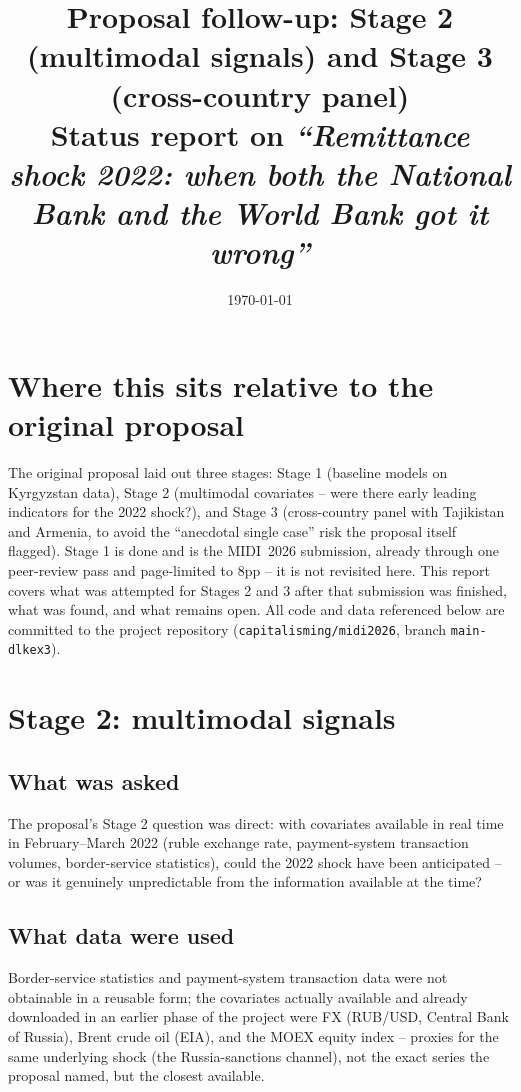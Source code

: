 \documentclass[11pt]{article}
\title{Proposal follow-up: Stage 2 (multimodal signals) and Stage 3 (cross-country panel)\\
\large Status report on \emph{``Remittance shock 2022: when both the National Bank and the World Bank got it wrong''}}
\author{}
\date{\today}
\begin{document}
\maketitle

\section*{Where this sits relative to the original proposal}

The original proposal laid out three stages: Stage 1 (baseline models on Kyrgyzstan data),
Stage 2 (multimodal covariates -- were there early leading indicators for the 2022 shock?), and
Stage 3 (cross-country panel with Tajikistan and Armenia, to avoid the ``anecdotal single case''
risk the proposal itself flagged). Stage 1 is done and is the MIDI~2026 submission, already
through one peer-review pass and page-limited to 8pp -- it is not revisited here. This report
covers what was attempted for Stages 2 and 3 after that submission was finished, what was found,
and what remains open. All code and data referenced below are committed to the project
repository (\texttt{capitalisming/midi2026}, branch \texttt{main-dlkex3}).

\section{Stage 2: multimodal signals}

\subsection{What was asked}
The proposal's Stage 2 question was direct: with covariates available in real time in
February--March 2022 (ruble exchange rate, payment-system transaction volumes, border-service
statistics), could the 2022 shock have been anticipated -- or was it genuinely unpredictable
from the information available at the time?

\subsection{What data were used}
Border-service statistics and payment-system transaction data were not obtainable in a reusable
form; the covariates actually available and already downloaded in an earlier phase of the
project were FX (RUB/USD, Central Bank of Russia), Brent crude oil (EIA), and the MOEX equity
index -- proxies for the same underlying shock (the Russia-sanctions channel), not the exact
series the proposal named, but the closest available.
\end{document}
